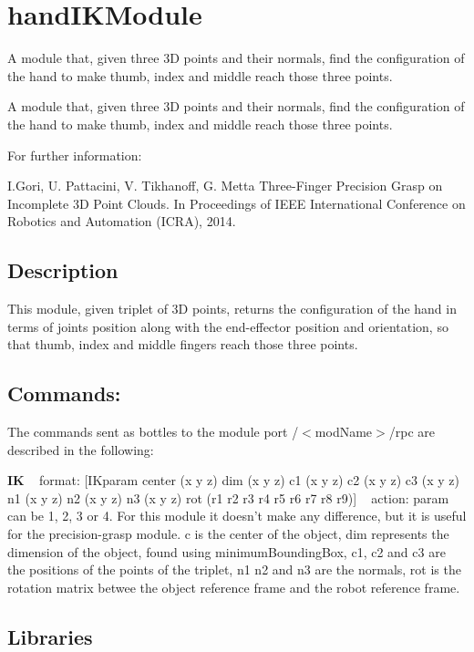 \section{hand\+I\+K\+Module}
\label{group__handIKModule}


A module that, given three 3\+D points and their normals, find the configuration of the hand to make thumb, index and middle reach those three points.  


A module that, given three 3\+D points and their normals, find the configuration of the hand to make thumb, index and middle reach those three points. 

For further information\+:

I.\+Gori, U. Pattacini, V. Tikhanoff, G. Metta Three-\/\+Finger Precision Grasp on Incomplete 3\+D Point Clouds. In Proceedings of I\+E\+E\+E International Conference on Robotics and Automation (I\+C\+R\+A), 2014.\hypertarget{group__handIKModule_intro_sec}{}\subsection{Description}\label{group__handIKModule_intro_sec}
This module, given triplet of 3\+D points, returns the configuration of the hand in terms of joints position along with the end-\/effector position and orientation, so that thumb, index and middle fingers reach those three points.\hypertarget{group__handIKModule_rpc_port}{}\subsection{Commands\+:}\label{group__handIKModule_rpc_port}
The commands sent as bottles to the module port /$<$mod\+Name$>$/rpc are described in the following\+:

{\bfseries I\+K} ~\newline
format\+: \mbox{[}I\+Kparam center (x y z) dim (x y z) c1 (x y z) c2 (x y z) c3 (x y z) n1 (x y z) n2 (x y z) n3 (x y z) rot (r1 r2 r3 r4 r5 r6 r7 r8 r9)\mbox{]} ~\newline
action\+: param can be 1, 2, 3 or 4. For this module it doesn't make any difference, but it is useful for the precision-\/grasp module. c is the center of the object, dim represents the dimension of the object, found using minimum\+Bounding\+Box, c1, c2 and c3 are the positions of the points of the triplet, n1 n2 and n3 are the normals, rot is the rotation matrix betwee the object reference frame and the robot reference frame.\hypertarget{group__handIKModule_lib_sec}{}\subsection{Libraries}\label{group__handIKModule_lib_sec}

